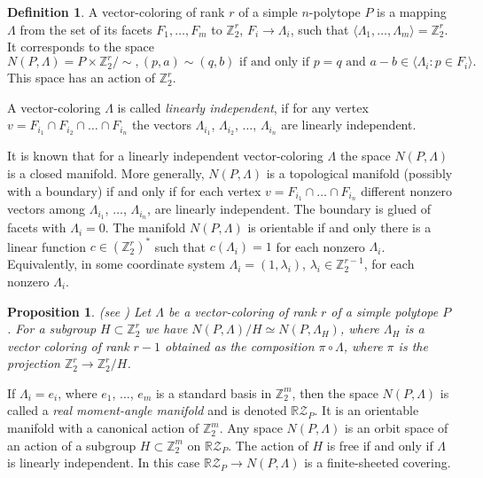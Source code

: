 \documentclass[12pt]{amsart}
\newtheorem{proposition}[formula]{Proposition}
\theoremstyle{definition}
\newtheorem{definition}[formula]{Definition}
\theoremstyle{remark}
\begin{document}
\begin{definition}\label{def:NP}
A vector-coloring of rank $r$ of a simple $n$-polytope $P$ is a mapping $\Lambda$ from the 
set of its facets $F_1,\dots, F_m$ to $\mathbb Z_2^r$, $F_i\to \Lambda_i$, such that 
$\langle\Lambda_1,\dots,\Lambda_m\rangle=\mathbb Z_2^r$. It corresponds to the space
$$
N(P,\Lambda)=P\times \mathbb Z_2^r/\sim, (p,a)\sim (q,b) \text{ if and only if } p=q\text{ and }a-b\in\langle \Lambda_i\colon p\in F_i\rangle. 
$$  
This space has an action of $\mathbb Z_2^r$. 

A vector-coloring $\Lambda$ is called {\it linearly independent}, if for any vertex 
$v=F_{i_1}\cap F_{i_2}\cap\dots\cap F_{i_n}$ the vectors $\Lambda_{i_1}$, $\Lambda_{i_2}$, $\dots$, $\Lambda_{i_n}$
are linearly independent.  
\end{definition}
It is known that for a linearly independent vector-coloring $\Lambda$ the space $N(P,\Lambda)$
is a closed manifold. More generally, $N(P,\Lambda)$ is a  topological manifold (possibly with a boundary)
if and only if for each vertex $v=F_{i_1}\cap\dots\cap F_{i_n}$ different nonzero vectors among $\Lambda_{i_1}$,
$\dots$,  $\Lambda_{i_n}$, are linearly independent. The boundary is glued of facets with $\Lambda_i=0$. The
manifold $N(P,\Lambda)$ is orientable if and only there is a linear function $c\in (\mathbb Z_2^r)^*$ such that
$c(\Lambda_i)=1$ for each nonzero $\Lambda_i$. Equivalently, in some coordinate system $\Lambda_i=(1,\lambda_i)$, 
$\lambda_i\in\mathbb Z_2^{r-1}$,  for each nonzero $\Lambda_i$. 

\begin{proposition}{\rm (see \cite[Corollary 1.12]{E24})}
Let $\Lambda$ be a vector-coloring of rank $r$ of a simple polytope $P$.
For a subgroup $H\subset \mathbb Z_2^r$ we have $N(P,\Lambda)/H\simeq N(P,\Lambda_H)$,
where $\Lambda_H$ is a vector coloring of rank $r-1$ obtained as the composition $\pi\circ\Lambda$, where
$\pi$ is the projection $\mathbb Z_2^r\to\mathbb Z_2^r/H$.
\end{proposition}

If $\Lambda_i=e_i$, where $e_1$, $\dots$, $e_m$ is a standard basis in $\mathbb Z_2^m$, then the space
$N(P,\Lambda)$ is called a {\it real moment-angle manifold} and is denoted $\mathbb R\mathcal{Z}_P$. It is an orientable manifold
with a canonical action of $\mathbb Z_2^m$.
Any space $N(P,\Lambda)$ is an orbit space of an action of a subgroup $H\subset \mathbb Z_2^m$
on $\mathbb R\mathcal{Z}_P$. The action of $H$ is free if and only if $\Lambda$ is linearly independent. In this case 
$\mathbb R\mathcal{Z}_P\to N(P,\Lambda)$ is a finite-sheeted covering.
\end{document}
